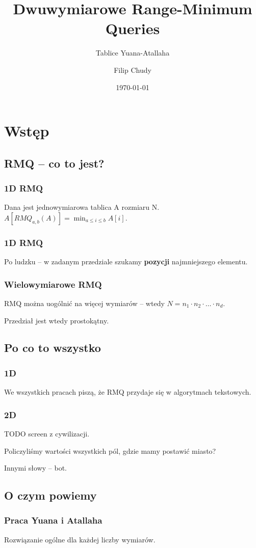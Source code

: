 \documentclass{beamer}
\begin{document}
\title{Dwuwymiarowe Range-Minimum Queries}
\subtitle{Tablice Yuana-Atallaha}
\author{Filip Chudy}
\date{\today}


\begin{frame}
\titlepage
\end{frame}

\section{Wstęp}

\subsection{RMQ -- co to jest?}
\begin{frame} \frametitle{1D RMQ}
 Dana jest jednowymiarowa tablica A rozmiaru N. $A[RMQ_{a,b}(A)] = \min_{a \leq i \leq b} A[i]$.
\end{frame}

\begin{frame} \frametitle{1D RMQ}
 Po ludzku -- w zadanym przedziale szukamy \textbf{pozycji} najmniejszego elementu.
\end{frame}

\begin{frame} \frametitle{Wielowymiarowe RMQ}
 RMQ można uogólnić na więcej wymiarów -- wtedy $N = n_1 \cdot n_2 \cdot \dots \cdot n_d$.
 
 Przedział jest wtedy prostokątny.
\end{frame}


\subsection{Po co to wszystko}
\begin{frame} \frametitle{1D}
 We wszystkich pracach piszą, że RMQ przydaje się w algorytmach tekstowych.
\end{frame}

\begin{frame} \frametitle{2D}
TODO screen z cywilizacji.

 Policzyliśmy wartości wszystkich pól, gdzie mamy postawić miasto?
 
 Innymi słowy -- bot.
\end{frame}

\subsection{O czym powiemy}
\begin{frame} \frametitle{Praca Yuana i Atallaha}
 Rozwiązanie ogólne dla każdej  liczby wymiarów.
\end{frame}
\end{document}
